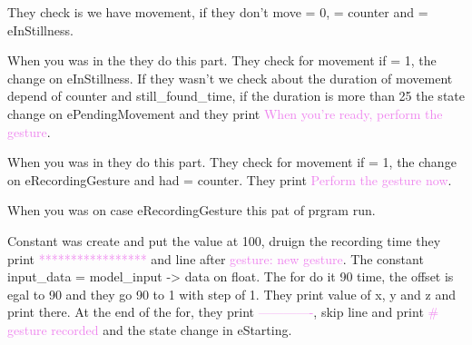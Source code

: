 \begin{center}
    \label{Magic Wand function}
\end{center}

They check is we have movement, if they don't move  = 0,   = counter and  = eInStillness.  

\begin{center}
    \label{Magic Wand function}
\end{center}

When you was in the  they do this part. They check for movement if  = 1, the  change on eInStillness. If they wasn't we check about the duration of movement depend of counter and still\_found\_time, if the duration is more than 25 the state change on ePendingMovement and they print \textcolor{violet}{When you're ready, perform the gesture}. 

\begin{center}
    \label{Magic Wand function}
\end{center}

When you was in  they do this part. They check for movement if  = 1, the  change on eRecordingGesture and had  = counter. They print \textcolor{violet}{Perform the gesture now}.

\begin{center}
    \label{Magic Wand function}
\end{center}

When you was on case eRecordingGesture this pat of prgram run. 

Constant  was create and put the value at 100, druign the recording time they print \textcolor{violet}{*****************} and line after \textcolor{violet}{gesture: new gesture}. 
The constant input\_data = model\_input -> data on float.
The for do it 90 time, the offset is egal to 90 and they go 90 to 1 with step of 1. They print value of x, y and z and print there. 
At the end of the for, they print \textcolor{violet}{-------------}, skip line and print \textcolor{violet}{\# gesture recorded} and the state change in eStarting. 


